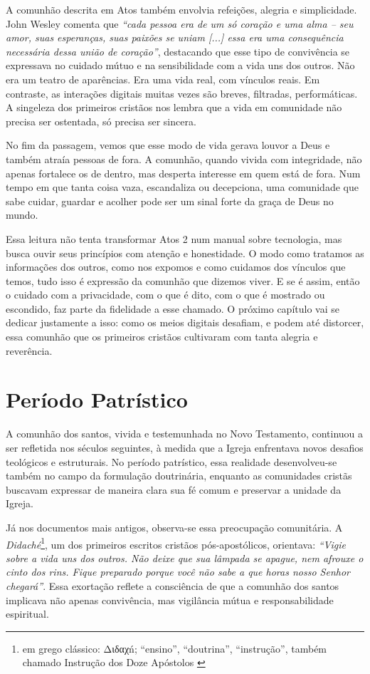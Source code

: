 A comunhão descrita em Atos também envolvia refeições, alegria e simplicidade. John Wesley comenta que \textit{``cada pessoa era de um só coração e uma alma – seu amor, suas esperanças, suas paixões se uniam [...] essa era uma consequência necessária dessa união de coração''}\cite{wesleyAtos4}, destacando que esse tipo de convivência se expressava no cuidado mútuo e na sensibilidade com a vida uns dos outros. Não era um teatro de aparências. Era uma vida real, com vínculos reais. Em contraste, as interações digitais muitas vezes são breves, filtradas, performáticas. A singeleza dos primeiros cristãos nos lembra que a vida em comunidade não precisa ser ostentada, só precisa ser sincera.

No fim da passagem, vemos que esse modo de vida gerava louvor a Deus e também atraía pessoas de fora. A comunhão, quando vivida com integridade, não apenas fortalece os de dentro, mas desperta interesse em quem está de fora. Num tempo em que tanta coisa vaza, escandaliza ou decepciona, uma comunidade que sabe cuidar, guardar e acolher pode ser um sinal forte da graça de Deus no mundo.

Essa leitura não tenta transformar Atos 2 num manual sobre tecnologia, mas busca ouvir seus princípios com atenção e honestidade. O modo como tratamos as informações dos outros, como nos expomos e como cuidamos dos vínculos que temos, tudo isso é expressão da comunhão que dizemos viver. E se é assim, então o cuidado com a privacidade, com o que é dito, com o que é mostrado ou escondido, faz parte da fidelidade a esse chamado. O próximo capítulo vai se dedicar justamente a isso: como os meios digitais desafiam, e podem até distorcer, essa comunhão que os primeiros cristãos cultivaram com tanta alegria e reverência.

\section{Período Patrístico}

A comunhão dos santos, vivida e testemunhada no Novo Testamento, continuou a ser refletida nos séculos seguintes, à medida que a Igreja enfrentava novos desafios teológicos e estruturais. No período patrístico, essa realidade desenvolveu-se também no campo da formulação doutrinária, enquanto as comunidades cristãs buscavam expressar de maneira clara sua fé comum e preservar a unidade da Igreja.

Já nos documentos mais antigos, observa-se essa preocupação comunitária. A \textit{Didaché}\footnote{em grego clássico: \foreignlanguage{greek}{Διδαχń}; ``ensino'', ``doutrina'', ``instrução'', também chamado Instrução dos Doze Apóstolos \cite{wikididaque}}, um dos primeiros escritos cristãos pós-apostólicos, orientava: \textit{``Vigie sobre a vida uns dos outros. Não deixe que sua lâmpada se apague, nem afrouxe o cinto dos rins. Fique preparado porque você não sabe a que horas nosso Senhor chegará''}\cite{didachePaulus2013}. Essa exortação reflete a consciência de que a comunhão dos santos implicava não apenas convivência, mas vigilância mútua e responsabilidade espiritual.

